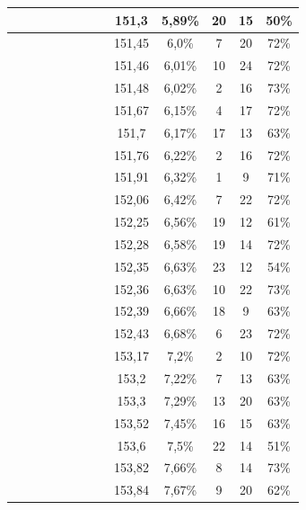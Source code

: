 \begin{center}
\begin{longtable}{|c|c|c|c|c|c|c|c|c|c|c|c|c|}
 \x &  &  &  \x &  &  &  &  \x & 151,3 & 5,89\% & 20 & 15 & 50\% \\ \hline
 \x &  \x &  &  \x &  &  \x &  &  \x & 151,45 & 6,0\% & 7 & 20 & 72\% \\ \hline
 \x &  \x &  \x &  \x &  \x &  \x &  &  \x & 151,46 & 6,01\% & 10 & 24 & 72\% \\ \hline
 \x &  \x &  &  &  \x &  \x &  \x &  \x & 151,48 & 6,02\% & 2 & 16 & 73\% \\ \hline
 \x &  \x &  &  \x &  \x &  \x &  \x &  \x & 151,67 & 6,15\% & 4 & 17 & 72\% \\ \hline
 \x &  &  \x &  \x &  &  &  &  \x & 151,7 & 6,17\% & 17 & 13 & 63\% \\ \hline
 \x &  &  \x &  \x &  \x &  \x &  \x &  \x & 151,76 & 6,22\% & 2 & 16 & 72\% \\ \hline
 \x &  &  \x &  \x &  \x &  \x &  &  \x & 151,91 & 6,32\% & 1 & 9 & 71\% \\ \hline
 \x &  &  \x &  \x &  &  \x &  \x &  \x & 152,06 & 6,42\% & 7 & 22 & 72\% \\ \hline
 \x &  \x &  &  &  \x &  &  &  \x & 152,25 & 6,56\% & 19 & 12 & 61\% \\ \hline
 \x &  &  &  &  \x &  \x &  &  \x & 152,28 & 6,58\% & 19 & 14 & 72\% \\ \hline
 \x &  \x &  &  \x &  &  &  &  \x & 152,35 & 6,63\% & 23 & 12 & 54\% \\ \hline
 \x &  \x &  &  &  &  \x &  \x &  \x & 152,36 & 6,63\% & 10 & 22 & 73\% \\ \hline
 \x &  \x &  \x &  \x &  \x &  &  \x &  \x & 152,39 & 6,66\% & 18 & 9 & 63\% \\ \hline
 \x &  &  &  \x &  \x &  \x &  &  \x & 152,43 & 6,68\% & 6 & 23 & 72\% \\ \hline
 \x &  \x &  &  &  \x &  \x &  &  \x & 153,17 & 7,2\% & 2 & 10 & 72\% \\ \hline
 \x &  \x &  \x &  &  &  &  \x &  \x & 153,2 & 7,22\% & 7 & 13 & 63\% \\ \hline
 \x &  &  \x &  \x &  \x &  &  \x &  \x & 153,3 & 7,29\% & 13 & 20 & 63\% \\ \hline
 \x &  &  \x &  \x &  &  &  \x &  \x & 153,52 & 7,45\% & 16 & 15 & 63\% \\ \hline
 \x &  &  &  \x &  &  &  &  \x & 153,6 & 7,5\% & 22 & 14 & 51\% \\ \hline
 \x &  \x &  \x &  &  &  \x &  \x &  \x & 153,82 & 7,66\% & 8 & 14 & 73\% \\ \hline
 \x &  &  \x &  \x &  \x &  &  &  \x & 153,84 & 7,67\% & 9 & 20 & 62\% \\ \hline

\end{longtable}
\end{center}
